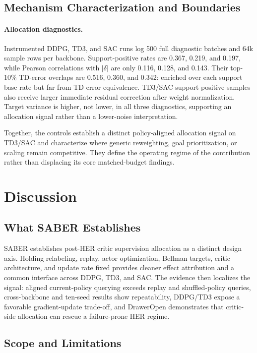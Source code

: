 \documentclass[letterpaper]{article}
\begin{document}
\FloatBarrier
\raggedbottom
\subsection{Mechanism Characterization and Boundaries}

\paragraph{Allocation diagnostics.}
Instrumented DDPG, TD3, and SAC runs log 500 full diagnostic batches and 64k sample rows per backbone. Support-positive rates are 0.367, 0.219, and 0.197, while Pearson correlations with \(|\delta|\) are only 0.116, 0.128, and 0.143. Their top-10\% TD-error overlaps are 0.516, 0.360, and 0.342: enriched over each support base rate but far from TD-error equivalence. TD3/SAC support-positive samples also receive larger immediate residual correction after weight normalization. Target variance is higher, not lower, in all three diagnostics, supporting an allocation signal rather than a lower-noise interpretation.

Together, the controls establish a distinct policy-aligned allocation signal on TD3/SAC and characterize where generic reweighting, goal prioritization, or scaling remain competitive. They define the operating regime of the contribution rather than displacing its core matched-budget findings.

\section{Discussion}

\subsection{What SABER Establishes}

SABER establishes post-HER critic supervision allocation as a distinct design axis. Holding relabeling, replay, actor optimization, Bellman targets, critic architecture, and update rate fixed provides cleaner effect attribution and a common interface across DDPG, TD3, and SAC. The evidence then localizes the signal: aligned current-policy querying exceeds replay and shuffled-policy queries, cross-backbone and ten-seed results show repeatability, DDPG/TD3 expose a favorable gradient-update trade-off, and DrawerOpen demonstrates that critic-side allocation can rescue a failure-prone HER regime.

\subsection{Scope and Limitations}
\end{document}
